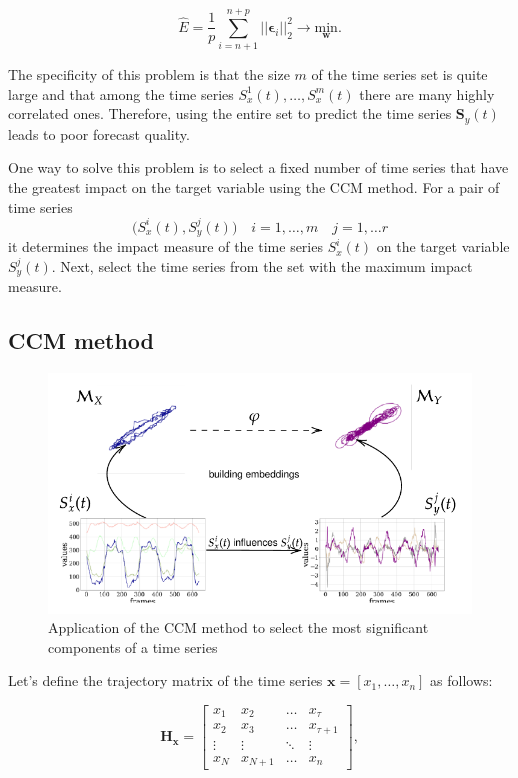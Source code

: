 \documentclass[bst/sn-mathphys]{sn-jnl}%
\newcommand{\bx}{\ensuremath{\mathbf{x}}}
\newcommand{\bw}{\mathbf{w}}
\newcommand{\bS}{\mathbf{S}}
\newcommand{\bH}{\mathbf{H}}
\theoremstyle{thmstyleone}%
\theoremstyle{thmstyletwo}%
\theoremstyle{thmstylethree}%
\begin{document}
\begin{equation*}
	\widehat{E} = \dfrac{1}{p} \sum\limits_{i=n+1}^{n+p} ||\boldsymbol{\epsilon}_i||_2^2 \rightarrow \underset{\bw}{\text{min}}.
\end{equation*}

The specificity of this problem is that the size $m$ of the time series set is quite large and that among the time series $S_x^1(t), \ldots, S_x^m(t)$ there are many highly correlated ones.
Therefore, using the entire set to predict the time series $\bS_y(t)$ leads to poor forecast quality.

One way to solve this problem is to select a fixed number of time series that have the greatest impact on the target variable using the CCM method.
For a pair of time series
\begin{equation*}
	\bigl(S_x^i(t), S_y^j(t) \bigr) \quad i = 1, \ldots, m \quad j = 1, \ldots r
\end{equation*} 
it determines the impact measure of the time series $S_x^i(t)$ on the target variable $S_y^j(t)$.
Next, select the time series from the set with the maximum impact measure.

\subsection{CCM method}
\begin{figure}[bhtp]
	\includegraphics[width=\textwidth]{block_scheme_4.pdf}
	\caption{Application of the CCM method to select the most significant components of a time series}
	\label{fig:schema}
\end{figure}

Let's define the trajectory matrix of the time series $\bx = [x_1, \ldots, x_n]$ as follows:

\begin{equation*} \label{eq:traj_mat}
	\bH_{\bx} = \begin{bmatrix}
		x_1 & x_2 & \ldots & x_{\tau} \\
		x_2 & x_3 & \ldots & x_{\tau+1} \\
		\vdots & \vdots & \ddots & \vdots \\
		x_{N} & x_{N+1} & \ldots & x_n
	\end{bmatrix}, 
\end{equation*} 
\end{document}
